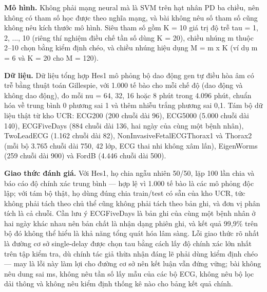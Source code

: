 \documentclass[12pt,a4paper]{article}
\begin{document}
\noindent \textbf{Mô hình.} Không phải mạng neural mà là SVM trên hạt nhân PD ba chiều, nên không có tham số học được theo nghĩa mạng, và bài không nêu số tham số cũng không nêu kích thước mô hình. Siêu tham số gồm K = 10 giá trị độ trễ tau = 1, 2, ..., 10 (riêng thí nghiệm điều chế tần số dùng K = 20), chiều nhúng m thuộc 2–10 chọn bằng kiểm định chéo, và chiều nhúng hiệu dụng M = m x K (ví dụ m = 6 và K = 20 cho M = 120).\par\vspace{3pt}
\noindent \textbf{Dữ liệu.} Dữ liệu tổng hợp Hes1 mô phỏng bộ dao động gen tự điều hòa âm có trễ bằng thuật toán Gillespie, với 1.000 tế bào cho mỗi chế độ (dao động và không dao động), đo mỗi nu = 64, 32, 16 hoặc 8 phút trong 4.096 phút, chuẩn hóa về trung bình 0 phương sai 1 và thêm nhiễu trắng phương sai 0,1. Tám bộ dữ liệu thật từ kho UCR: ECG200 (200 chuỗi dài 96), ECG5000 (5.000 chuỗi dài 140), ECGFiveDays (884 chuỗi dài 136, hai ngày của cùng một bệnh nhân), TwoLeadECG (1.162 chuỗi dài 82), NonInvasiveFetalECGThorax1 và Thorax2 (mỗi bộ 3.765 chuỗi dài 750, 42 lớp, ECG thai nhi không xâm lấn), EigenWorms (259 chuỗi dài 900) và FordB (4.446 chuỗi dài 500).\par\vspace{3pt}
\noindent \textbf{Giao thức đánh giá.} Với Hes1, họ chia ngẫu nhiên 50/50, lặp 100 lần chia và báo cáo độ chính xác trung bình — hợp lệ vì 1.000 tế bào là các mô phỏng độc lập; với tám bộ thật, họ dùng đúng chia train/test có sẵn của kho UCR, tức không phải tách theo chủ thể cũng không phải tách theo bản ghi, và đơn vị phân tích là cả chuỗi. Cần lưu ý ECGFiveDays là bản ghi của cùng một bệnh nhân ở hai ngày khác nhau nên bản chất là nhận dạng phiên ghi, và kết quả 99,9\% trên bộ đó không thể hiểu là khả năng tổng quát hóa lâm sàng. Lỗi giao thức rõ nhất là đường cơ sở single-delay được chọn tau bằng cách lấy độ chính xác lớn nhất trên tập kiểm tra, dù chính tác giả thừa nhận đáng lẽ phải dùng kiểm định chéo — may là lỗi này làm lợi cho đường cơ sở nên kết luận vẫn đứng vững; bài không nêu dung sai ms, không nêu tần số lấy mẫu của các bộ ECG, không nêu bộ lọc dải thông và không nêu kiểm định thống kê nào cho bảng kết quả chính.\par\vspace{3pt}
\end{document}
